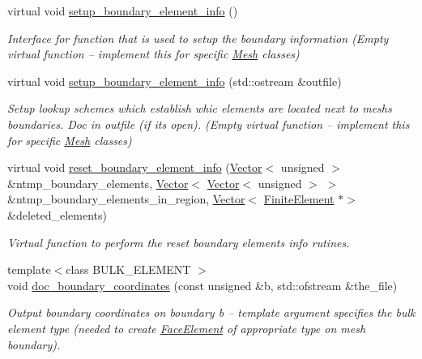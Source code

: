 \begin{DoxyCompactItemize}
virtual void \hyperlink{classoomph_1_1Mesh_a6cc8bcd6b41209f0e9295cc993d9c6bb}{setup\+\_\+boundary\+\_\+element\+\_\+info} ()
\begin{DoxyCompactList}\small\item\em Interface for function that is used to setup the boundary information (Empty virtual function -- implement this for specific \hyperlink{classoomph_1_1Mesh}{Mesh} classes) \end{DoxyCompactList}\item 
virtual void \hyperlink{classoomph_1_1Mesh_a413cbcbea4fb1111703da9ee97429640}{setup\+\_\+boundary\+\_\+element\+\_\+info} (std\+::ostream \&outfile)
\begin{DoxyCompactList}\small\item\em Setup lookup schemes which establish whic elements are located next to mesh\textquotesingle{}s boundaries. Doc in outfile (if it\textquotesingle{}s open). (Empty virtual function -- implement this for specific \hyperlink{classoomph_1_1Mesh}{Mesh} classes) \end{DoxyCompactList}\item 
virtual void \hyperlink{classoomph_1_1Mesh_af5495baffd4b886b65a53a0ad67bf0df}{reset\+\_\+boundary\+\_\+element\+\_\+info} (\hyperlink{classoomph_1_1Vector}{Vector}$<$ unsigned $>$ \&ntmp\+\_\+boundary\+\_\+elements, \hyperlink{classoomph_1_1Vector}{Vector}$<$ \hyperlink{classoomph_1_1Vector}{Vector}$<$ unsigned $>$ $>$ \&ntmp\+\_\+boundary\+\_\+elements\+\_\+in\+\_\+region, \hyperlink{classoomph_1_1Vector}{Vector}$<$ \hyperlink{classoomph_1_1FiniteElement}{Finite\+Element} $\ast$$>$ \&deleted\+\_\+elements)
\begin{DoxyCompactList}\small\item\em Virtual function to perform the reset boundary elements info rutines. \end{DoxyCompactList}\item 
{\footnotesize template$<$class B\+U\+L\+K\+\_\+\+E\+L\+E\+M\+E\+NT $>$ }\\void \hyperlink{classoomph_1_1Mesh_a68cad622b3fe39d306fe367d0fdf4083}{doc\+\_\+boundary\+\_\+coordinates} (const unsigned \&b, std\+::ofstream \&the\+\_\+file)
\begin{DoxyCompactList}\small\item\em Output boundary coordinates on boundary b -- template argument specifies the bulk element type (needed to create \hyperlink{classoomph_1_1FaceElement}{Face\+Element} of appropriate type on mesh boundary). \end{DoxyCompactList}\item 
$$
\end{DoxyCompactItemize}
